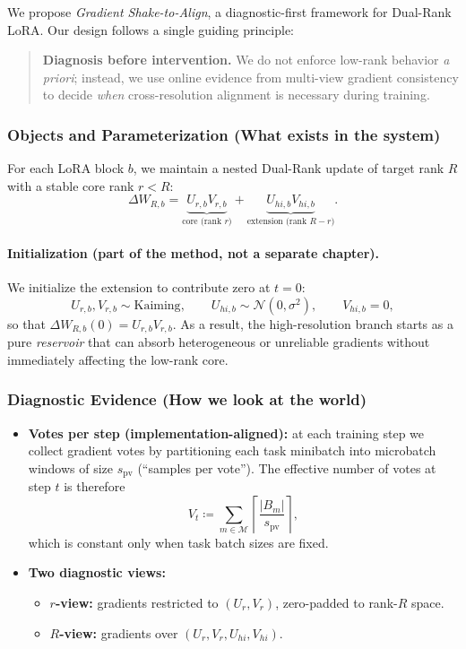 \documentclass{article}
\begin{document}
We propose \textit{Gradient Shake-to-Align}, a diagnostic-first framework for Dual-Rank LoRA.
Our design follows a single guiding principle:

\begin{quote}
\textbf{Diagnosis before intervention.}
We do not enforce low-rank behavior \emph{a priori}; instead, we use online evidence from
multi-view gradient consistency to decide \emph{when} cross-resolution alignment
is necessary during training.
\end{quote}

\subsubsection{Objects and Parameterization (What exists in the system)}
For each LoRA block $b$, we maintain a nested Dual-Rank update of target rank $R$
with a stable core rank $r<R$:
\begin{equation}
\Delta W_{R,b}
=
\underbrace{U_{r,b}V_{r,b}}_{\text{core (rank } r\text{)}}
+
\underbrace{U_{hi,b}V_{hi,b}}_{\text{extension (rank } R-r\text{)}}.
\end{equation}

\paragraph{Initialization (part of the method, not a separate chapter).}
We initialize the extension to contribute zero at $t=0$:
\begin{equation}
U_{r,b},V_{r,b}\sim \text{Kaiming},\qquad
U_{hi,b}\sim \mathcal{N}(0,\sigma^2),\qquad
V_{hi,b}=0,
\end{equation}
so that $\Delta W_{R,b}(0)=U_{r,b}V_{r,b}$.
As a result, the high-resolution branch starts as a pure \emph{reservoir}
that can absorb heterogeneous or unreliable gradients
without immediately affecting the low-rank core.

\subsubsection{Diagnostic Evidence (How we look at the world)}
\begin{itemize}
    \item \textbf{Votes per step (implementation-aligned):}
    at each training step we collect gradient votes by partitioning each task minibatch into
    microbatch windows of size $s_{\mathrm{pv}}$ (``samples per vote'').
    The effective number of votes at step $t$ is therefore
    \[
      V_t \coloneqq \sum_{m\in\mathcal{M}} \left\lceil \frac{|B_m|}{s_{\mathrm{pv}}} \right\rceil,
    \]
    which is constant only when task batch sizes are fixed.
    \item \textbf{Two diagnostic views:}
    \begin{itemize}
        \item \textbf{$r$-view:} gradients restricted to $(U_r,V_r)$,
        zero-padded to rank-$R$ space.
        \item \textbf{$R$-view:} gradients over $(U_r,V_r,U_{hi},V_{hi})$.
    \end{itemize}
\end{itemize}
\end{document}
